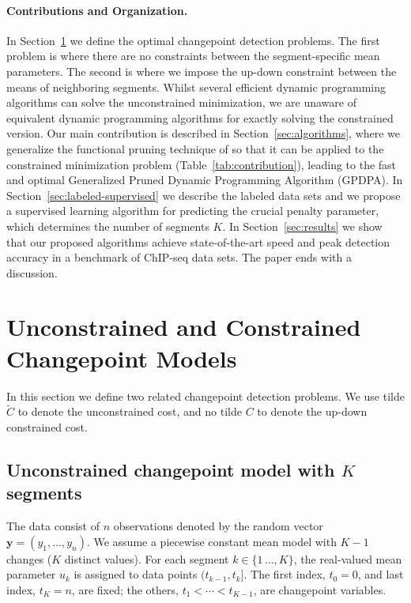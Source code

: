 \documentclass[twoside,11pt]{article}
\begin{document}
\paragraph{Contributions and Organization.} In
Section~\ref{sec:models} we define the optimal changepoint detection
problems. The first problem is where there are no constraints between the
segment-specific mean parameters. The second
is where we impose the up-down constraint
between the means of neighboring segments. Whilst
several efficient dynamic programming algorithms can solve the
unconstrained minimization, we are unaware of equivalent dynamic
programming algorithms for exactly solving the constrained version.
Our main contribution is described in Section~\ref{sec:algorithms},
where we generalize the functional pruning technique of
\citet{pruned-dp} so that it can be applied to the constrained
minimization problem (Table~\ref{tab:contribution}), leading to the fast and optimal Generalized Pruned Dynamic Programming
Algorithm (GPDPA). In Section~\ref{sec:labeled-supervised} we describe the labeled data sets and we propose a supervised learning algorithm for predicting the crucial penalty parameter, which determines the number of segments $K$. In Section~\ref{sec:results} we show that our proposed algorithms
achieve state-of-the-art speed and peak detection accuracy in a
benchmark of ChIP-seq data sets. The paper ends with a
discussion.

\section{Unconstrained and Constrained Changepoint Models}
\label{sec:models}

In this section we define two related changepoint detection
problems. 
We use tilde $\tilde{C}$
to denote the unconstrained cost, and no tilde $C$ to denote the
up-down constrained cost.

\subsection{Unconstrained changepoint model with $K$ segments}

The data consist of $n$ observations denoted by the random vector
$\mathbf y = (y_1, \dots, y_n)$. 
We assume a piecewise constant mean model with
$K-1$ changes ($K$ distinct values). For each segment
$k\in\{1\,\dots,K\}$, the real-valued mean parameter $u_k$ is assigned
to data points $(t_{k-1},t_k]$. The first index, $t_0=0$, and last
index, $t_K=n$, are fixed; the others, $t_1<\cdots<t_{K-1}$, are
changepoint variables. 
\end{document}
